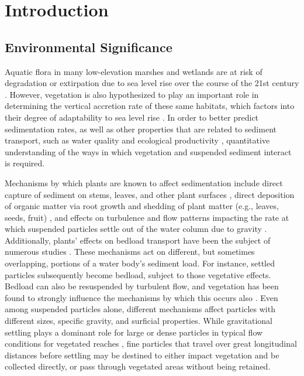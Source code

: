 \documentclass[geosciences,article,submit,moreauthors,pdftex]{Definitions/mdpi}
\begin{document}
\section{Introduction}

\subsection{Environmental Significance}

Aquatic flora in many low-elevation marshes and wetlands are at risk of degradation or extirpation due to sea level rise over the course of the 21st century \cite{thorne2018us,jankowski2017vulnerability}. However, vegetation is also hypothesized to play an important role in determining the vertical accretion rate of these same habitats, which factors into their degree of adaptability to sea level rise \cite{kirwan2010limits}. In order to better predict sedimentation rates, as well as other properties that are related to sediment transport, such as water quality \cite{goodwin2003temporal} and ecological productivity \cite{kirwan2007coupled}, quantitative understanding of the ways in which vegetation and suspended sediment interact is required. 

Mechanisms by which plants are known to affect sedimentation include direct capture of sediment on stems, leaves, and other plant surfaces \cite{mudd2010does}, direct deposition of organic matter via root growth and shedding of plant matter (e.g., leaves, seeds, fruit) \cite{nyman2006marsh, neubauer2008contributions}, and effects on turbulence and flow patterns impacting the rate at which suspended particles settle out of the water column due to gravity \cite{christiansen2000flow, leonard1995flow}. Additionally, plants' effects on bedload transport have been the subject of numerous studies \cite[e.g.,][]{yager2013influence, yang2019impact, jordanova2003experimental}. These mechanisms act on different, but sometimes overlapping, portions of a water body's sediment load. For instance, settled particles subsequently become bedload, subject to those vegetative effects. Bedload can also be resuspended by turbulent flow, and vegetation has been found to strongly influence the mechanisms by which this occurs also \cite{tinoco2018turbulence}. Even among suspended particles alone, different mechanisms affect particles with different sizes, specific gravity, and surficial properties. While gravitational settling plays a dominant role for large or dense particles in typical flow conditions for vegetated reaches \cite{mudd2010does, leonard1995flow}, fine particles that travel over great longitudinal distances before settling may be destined to either impact vegetation and be collected directly, or pass through vegetated areas without being retained.
\end{document}
